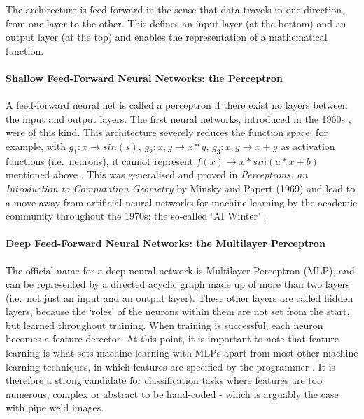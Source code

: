 \documentclass[a4paper,11pt]{article}
\begin{document}
The architecture is feed-forward in the sense that data travels in one direction, from one layer to the other. This defines an input layer (at the bottom) and an output layer (at the top) and enables the representation of a mathematical function.

\paragraph{Shallow Feed-Forward Neural Networks: the Perceptron} 

A feed-forward neural net is called a perceptron if there exist no layers between the input and output layers. The first neural networks, introduced in the 1960s \cite{DL-book}, were of this kind. This architecture severely reduces the function space: for example, with $g_{1}: x \rightarrow sin(s)$, $g_{2}: x,y \rightarrow x*y$, $g_{3}: x,y \rightarrow x+y$ as activation functions (i.e.\ neurons), it cannot represent $f(x) \rightarrow x*sin(a*x+b)$ mentioned above \cite{DL-book}. This was generalised and proved in \textit{Perceptrons: an Introduction to Computation Geometry} by Minsky and Papert (1969) and lead to a move away from artificial neural networks for machine learning by the academic community throughout the 1970s: the so-called `AI Winter' \cite{Russel & Norvig}. 

\paragraph{Deep Feed-Forward Neural Networks: the Multilayer Perceptron} 

The official name for a deep neural network is Multilayer Perceptron (MLP), and can be represented by a directed acyclic graph made up of more than two layers (i.e.\ not just an input and an output layer). These other layers are called hidden layers, because the `roles' of the neurons within them are not set from the start, but learned throughout training. When training is successful, each neuron becomes a feature detector. At this point, it is important to note that feature learning is what sets machine learning with MLPs apart from most other machine learning techniques, in which features are specified by the programmer \cite{DL-book}. It is therefore a strong candidate for classification tasks where features are too numerous, complex or abstract to be hand-coded - which is arguably the case with pipe weld images.\\ 
\end{document}
